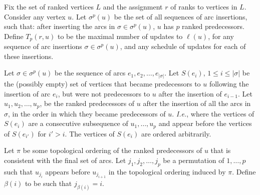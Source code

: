 \documentclass[11pt]{article}
\theoremstyle{plain}
\theoremstyle{definition}
\theoremstyle{remark}
\numberwithin{equation}{section}
\begin{document}
Fix the set of ranked vertices $L$ and the assignment $r$ of ranks
to vertices in $L$. Consider any vertex $u$. Let $\sigma^p(u)$ be
the set of all sequences of arc insertions, such that: after
inserting the arcs in $\sigma \in \sigma^p(u)$,  $u$ has  $p$ ranked
predecessors. Define $T_p(r,u)$ to be the maximal number of updates
to $\ell(u)$, for any sequence of arc insertions $\sigma \in
\sigma^p(u)$, and any schedule of updates for each of these
insertions.

 Let $\sigma \in \sigma^p(u)$ be the sequence of arcs $e_1, e_2, \ldots, e_{|\sigma|}$. Let $S(e_i)$, $1 \leq i \leq |\sigma|$ be the (possibly empty) set of vertices that became predecessors to $u$ following
the insertion of arc $e_i$, but were not predecessors to $u$ after the insertion of $e_{i-1}$.
Let
$u_1, u_2, \ldots, u_{p}$,  be the ranked predecessors of $u$ after the insertion of all the arcs in $\sigma$, in the order in which they became predecessors of $u$. {\sl I.e.}, where the vertices of $S(e_i)$ are a consecutive subsequence of $u_1, \ldots, u_p$ and appear before the vertices of $S(e_{i'})$ for $i' > i$. The vertices of $S(e_i)$ are ordered arbitrarily.

Let $\pi$ be some topological ordering of the ranked predecessors of $u$ that is consistent with the final set of arcs.
Let $j_1, j_2, \ldots, j_p$ be a
permutation of $1,\ldots,p$ such that $u_{j_i}$ appears before
$u_{j_{i+1}}$ in the topological ordering induced by $\pi$. Define $\beta(i)$ to be such that $j_{\beta(i)}=i$.
\end{document}
